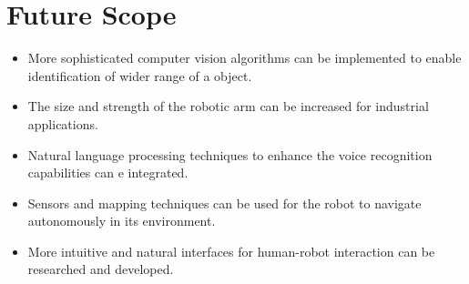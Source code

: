 \chapter{Future Scope}
\begin{itemize}
    \item More sophisticated computer vision algorithms can be implemented to enable identification of wider range of a object.
    \item The size and strength of the robotic arm can be increased for industrial applications.
    \item Natural language processing techniques to enhance the voice recognition capabilities can e integrated. 
    \item Sensors and mapping techniques can be used for the robot to navigate autonomously in its environment. 
    \item More intuitive and natural interfaces for human-robot interaction can be researched and developed.
\end{itemize}
